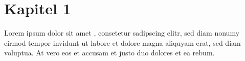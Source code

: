 \documentclass{report}
\begin{document}
	\chapter{Kapitel 1}
	Lorem ipsum dolor sit amet \cite[Kapitel 1, S.~1]{Schoening2009}, consetetur sadipscing elitr, sed diam nonumy eirmod tempor invidunt ut labore et dolore magna aliquyam erat, sed diam voluptua. At vero eos et accusam et justo duo dolores et ea rebum.
	\cite{Lange.2006}
	
	
		
\end{document}
